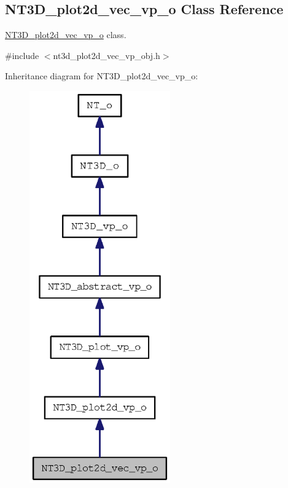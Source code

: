 \subsection{NT3D\_\-plot2d\_\-vec\_\-vp\_\-o Class Reference}
\label{class_n_t3_d__plot2d__vec__vp__o}


\hyperlink{class_n_t3_d__plot2d__vec__vp__o}{NT3D\_\-plot2d\_\-vec\_\-vp\_\-o} class.  




{\ttfamily \#include $<$nt3d\_\-plot2d\_\-vec\_\-vp\_\-obj.h$>$}



Inheritance diagram for NT3D\_\-plot2d\_\-vec\_\-vp\_\-o:
\nopagebreak
\begin{figure}[H]
\begin{center}
\leavevmode
\includegraphics[width=172pt]{class_n_t3_d__plot2d__vec__vp__o__inherit__graph}
\end{center}
\end{figure}


